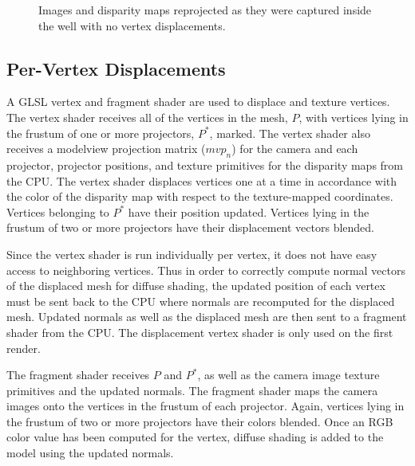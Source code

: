 \documentclass{llncs}
\begin{document}

\begin{figure}[!h]
	\vspace{-0.2cm}
	\centering
	\caption{Images and disparity maps reprojected as they were captured inside the well with no vertex displacements.}
	\label{fig:result2}
\end{figure}

\subsection{Per-Vertex Displacements}
\label{subsec:displacements}
\noindent A GLSL vertex and fragment shader are used to displace and texture vertices. The vertex shader receives all of the vertices in the mesh, $P$, with vertices lying in the frustum of one or more projectors, $P^*$, marked. The vertex shader also receives a modelview projection matrix ($mvp_n$) for the camera and each projector, projector positions, and texture primitives for the disparity maps from the CPU. The vertex shader displaces vertices one at a time in accordance with the color of the disparity map with respect to the texture-mapped coordinates. Vertices belonging to $P^{*}$ have their position updated. Vertices lying in the frustum of two or more projectors have their displacement vectors blended.

Since the vertex shader is run individually per vertex, it does not have easy access to neighboring vertices. Thus in order to correctly compute normal vectors of the displaced mesh for diffuse shading, the updated position of each vertex must be sent back to the CPU where normals are recomputed for the displaced mesh. Updated normals as well as the displaced mesh are then sent to a fragment shader from the CPU. The displacement vertex shader is only used on the first render.

The fragment shader receives $P$ and $P^{*}$, as well as the camera image texture primitives and the updated normals. The fragment shader maps the camera images onto the vertices in the frustum of each projector. Again, vertices lying in the frustum of two or more projectors have their colors blended. Once an RGB color value has been computed for the vertex, diffuse shading is added to the model using the updated normals.
\end{document}
